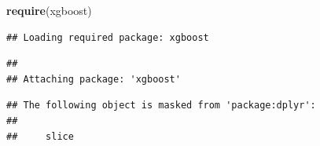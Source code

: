 \documentclass[
]{article}
\newenvironment{Shaded}{\begin{snugshade}}{\end{snugshade}}
\newcommand{\CommentTok}[1]{\textcolor[rgb]{0.56,0.35,0.01}{\textit{#1}}}
\newcommand{\FunctionTok}[1]{\textcolor[rgb]{0.13,0.29,0.53}{\textbf{#1}}}
\newcommand{\NormalTok}[1]{#1}
\begin{document}
\begin{Shaded}
\begin{Highlighting}[]
\FunctionTok{require}\NormalTok{(xgboost)}
\end{Highlighting}
\end{Shaded}

\begin{verbatim}
## Loading required package: xgboost
\end{verbatim}

\begin{verbatim}
## 
## Attaching package: 'xgboost'
\end{verbatim}

\begin{verbatim}
## The following object is masked from 'package:dplyr':
## 
##     slice
\end{verbatim}

\begin{Shaded}
\end{Shaded}
\end{document}
